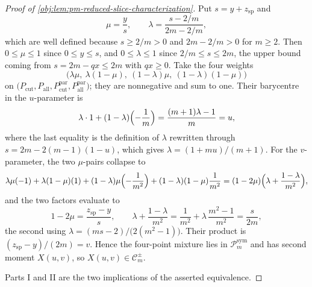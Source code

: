 \begin{proof}[Proof of \cref{obj:lem:pm-reduced-slice-characterization}]
Put \(s=y+z_{\mathrm{sp}}\) and
\[
\mu=\frac{y}{s},
\qquad
\lambda=\frac{s-2/m}{2m-2/m},
\]
which are well defined because \(s\ge2/m>0\) and \(2m-2/m>0\) for \(m\ge2\).  Then \(0\le\mu\le1\) since \(0\le y\le s\), and \(0\le\lambda\le1\) since \(2/m\le s\le 2m\), the upper bound coming from \(s=2m-qx\le2m\) with \(qx\ge0\).  Take the four weights
\[
\bigl(\lambda\mu,\ \lambda(1-\mu),\ (1-\lambda)\mu,\ (1-\lambda)(1-\mu)\bigr)
\]
on \(\bigl(P_{\mathrm{cut}},P_{\mathrm{all}},P^{\mathrm{par}}_{\mathrm{cut}},P^{\mathrm{par}}_{\mathrm{all}}\bigr)\); they are nonnegative and sum to one.  Their barycentre in the \(u\)-parameter is
\[
\lambda\cdot1+(1-\lambda)\Bigl(-\frac1m\Bigr)
=\frac{(m+1)\lambda-1}{m}
=u,
\]
where the last equality is the definition of \(\lambda\) rewritten through \(s=2m-2(m-1)(1-u)\), which gives \(\lambda=(1+mu)/(m+1)\).  For the \(v\)-parameter, the two \(\mu\)-pairs collapse to
\[
\lambda\mu(-1)+\lambda(1-\mu)(1)
+(1-\lambda)\mu\Bigl(-\frac1{m^2}\Bigr)+(1-\lambda)(1-\mu)\frac1{m^2}
=(1-2\mu)\Bigl(\lambda+\frac{1-\lambda}{m^2}\Bigr),
\]
and the two factors evaluate to
\[
1-2\mu=\frac{z_{\mathrm{sp}}-y}{s},
\qquad
\lambda+\frac{1-\lambda}{m^2}
=\frac{1}{m^2}+\lambda\,\frac{m^2-1}{m^2}
=\frac{s}{2m},
\]
the second using \(\lambda=(ms-2)/\bigl(2(m^2-1)\bigr)\).  Their product is \((z_{\mathrm{sp}}-y)/(2m)=v\).  Hence the four-point mixture lies in \(\mathcal P_m^{\mathrm{sym}}\) and has second moment \(X(u,v)\), so \(X(u,v)\in\mathcal C_m^{\pm}\). %


Parts I and II are the two implications of the asserted equivalence. %
\end{proof}
